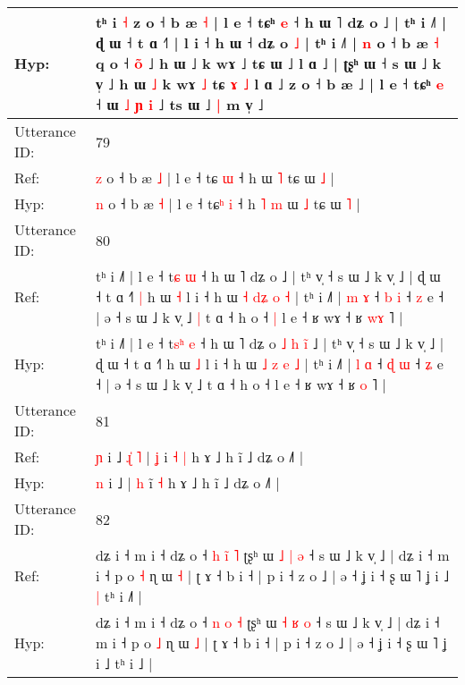 \documentclass[10pt]{article}
\DeclareRobustCommand{\hl}[1]{{\textcolor{red}{#1}}}
\begin{document}
\begin{longtable}{ll}
 \\
Hyp: & tʰ i\hl{}\hl{}\hl{} \hl{˧} z o ˧ b æ \hl{˧} | l e ˧ tɕʰ \hl{e} ˧ h ɯ ˥ dʑ o ˩ | tʰ i ˩˥ | ɖ ɯ ˧ t ɑ ˧˥ | l i ˧ h ɯ ˧ dʑ o \hl{˩} | tʰ i ˩˥ | \hl{n} o ˧ b æ\hl{}\hl{} \hl{˧} q o ˧ \hl{}\hl{o}\hl{̃} ˩ h ɯ ˩ k wɤ ˩ tɕ ɯ ˩ l ɑ ˩ | ʈʂʰ ɯ ˧ s ɯ ˩ k v̩ ˩\hl{}\hl{} h ɯ \hl{˩} k wɤ \hl{˩} tɕ \hl{ɤ} \hl{˩} l ɑ ˩\hl{}\hl{} z o ˧ b æ ˩ | l e ˧ tɕʰ \hl{e} ˧\hl{}\hl{} ɯ \hl{˩} \hl{ɲ} \hl{i} ˩ ts ɯ ˩\hl{ }\hl{|} m v̩ ˩\hl{}\hl{}
 \\
\midrule
Utterance ID: & 79 \\
Ref: & \hl{z} o ˧ b æ \hl{˩} | l e ˧ tɕ\hl{} \hl{ɯ} ˧ h\hl{}\hl{}\hl{}\hl{} ɯ \hl{˥} tɕ ɯ \hl{˩} |
 \\
Hyp: & \hl{n} o ˧ b æ \hl{˧} | l e ˧ tɕ\hl{ʰ} \hl{i} ˧ h\hl{ }\hl{˥}\hl{ }\hl{m} ɯ \hl{˩} tɕ ɯ \hl{˥} |
 \\
\midrule
Utterance ID: & 80 \\
Ref: & tʰ i ˩˥ | l e ˧ t\hl{}\hl{ɕ} \hl{ɯ} ˧ h ɯ ˥ dʑ o\hl{}\hl{}\hl{}\hl{}\hl{}\hl{}\hl{} ˩ | tʰ v̩ ˧ s ɯ ˩ k v̩ ˩ | ɖ ɯ ˧ t ɑ ˧˥\hl{ }\hl{|} h ɯ \hl{˧} l i ˧ h ɯ \hl{˧} \hl{d}\hl{ʑ} \hl{o} \hl{˧} | tʰ i ˩˥ | \hl{m} \hl{ɤ} ˧ \hl{b} \hl{i} ˧ \hl{z} e ˧ | ə ˧ s ɯ ˩ k v̩ ˩\hl{ }\hl{|} t ɑ ˧ h o ˧\hl{ }\hl{|} l e ˧ ʁ wɤ ˧ ʁ \hl{w}\hl{ɤ} ˥ |
 \\
Hyp: & tʰ i ˩˥ | l e ˧ t\hl{s}\hl{ʰ} \hl{e} ˧ h ɯ ˥ dʑ o\hl{ }\hl{˩}\hl{ }\hl{h}\hl{ }\hl{i}\hl{̃} ˩ | tʰ v̩ ˧ s ɯ ˩ k v̩ ˩ | ɖ ɯ ˧ t ɑ ˧˥\hl{}\hl{} h ɯ \hl{˩} l i ˧ h ɯ \hl{˩} \hl{}\hl{z} \hl{e} \hl{˩} | tʰ i ˩˥ | \hl{l} \hl{ɑ} ˧ \hl{ɖ} \hl{ɯ} ˧ \hl{ʑ} e ˧ | ə ˧ s ɯ ˩ k v̩ ˩\hl{}\hl{} t ɑ ˧ h o ˧\hl{}\hl{} l e ˧ ʁ wɤ ˧ ʁ \hl{}\hl{o} ˥ |
 \\
\midrule
Utterance ID: & 81 \\
Ref: & \hl{ɲ} i ˩\hl{ }\hl{ɻ}\hl{̍}\hl{ }\hl{˥} | \hl{ʝ} i\hl{ }\hl{˧} \hl{|} h ɤ ˩ h ĩ ˩ dʑ o ˩˥ |
 \\
Hyp: & \hl{n} i ˩\hl{}\hl{}\hl{}\hl{}\hl{} | \hl{h} i\hl{}\hl{̃} \hl{˧} h ɤ ˩ h ĩ ˩ dʑ o ˩˥ |
 \\
\midrule
Utterance ID: & 82 \\
Ref: & dʑ i ˧ m i ˧ dʑ o ˧ \hl{h} \hl{i}\hl{̃} \hl{˥} ʈʂʰ ɯ \hl{˩} \hl{|} \hl{ə} ˧ s ɯ ˩ k v̩ ˩ | dʑ i ˧ m i ˧ p o \hl{˧} ɳ ɯ \hl{˧} | ʈ ɤ ˧ b i ˧ | p i ˧ z o ˩ | ə ˧ ʝ i ˧ ʂ ɯ ˥ ʝ i ˩\hl{ }\hl{|} tʰ i ˩\hl{˥} |
 \\
Hyp: & dʑ i ˧ m i ˧ dʑ o ˧ \hl{n} \hl{}\hl{o} \hl{˧} ʈʂʰ ɯ \hl{˧} \hl{ʁ} \hl{o} ˧ s ɯ ˩ k v̩ ˩ | dʑ i ˧ m i ˧ p o \hl{˩} ɳ ɯ \hl{˩} | ʈ ɤ ˧ b i ˧ | p i ˧ z o ˩ | ə ˧ ʝ i ˧ ʂ ɯ ˥ ʝ i ˩\hl{}\hl{} tʰ i ˩\hl{} |

\end{longtable}
\end{document}
